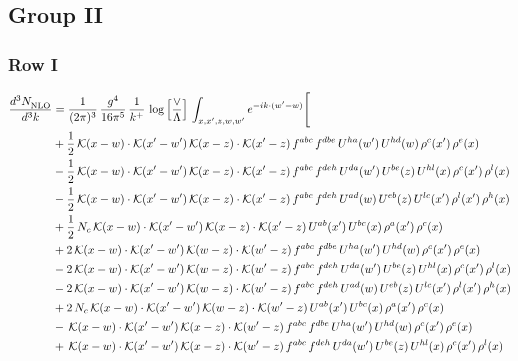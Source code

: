 \documentclass[9pt]{article}
\numberwithin{equation}{section}
\begin{document}
\subsection{Group II}
\subsubsection{Row I}
\begin{align}
 \frac{d^{3}N_{\rm NLO}^{\rm}}{d^{3}k}  & = \frac{1}{(2\pi)^{3}}\,\frac{g^{4}}{16\pi^{5}}\,\frac{1}{k^{+}}\,\log{\left[\frac{\vee}{\Lambda}\right]}\,\int_{x,x',z,w,w'}e^{-ik\cdot(w'-w)}\Bigg[\notag\\
&+\frac{1}{2}\,\mathcal{K}(x-w)\cdot\mathcal{K}(x'-w')\,\mathcal{K}(x-z)\cdot\mathcal{K}(x'-z)\,f^{abc}\,f^{dbe}\,U^{ha}(w')\,U^{hd}(w)\,\rho^{c}(x')\,\rho^{e}(x)\notag\\
&-\frac{1}{2}\,\mathcal{K}(x-w)\cdot\mathcal{K}(x'-w')\,\mathcal{K}(x-z)\cdot\mathcal{K}(x'-z)\,f^{abc}\,f^{deh}\,U^{da}(w')\,U^{be}(z)\,U^{hl}(x)\,\rho^{c}(x')\,\rho^{l}(x)\notag\\
&-\frac{1}{2}\,\mathcal{K}(x-w)\cdot\mathcal{K}(x'-w')\,\mathcal{K}(x-z)\cdot\mathcal{K}(x'-z)\,f^{abc}\,f^{deh}\,U^{ad}(w)\,U^{eb}(z)\,U^{lc}(x')\,\rho^{l}(x')\,\rho^{h}(x)\notag\\
&+\frac{1}{2}\,N_{c}\,\mathcal{K}(x-w)\cdot\mathcal{K}(x'-w')\,\mathcal{K}(x-z)\cdot\mathcal{K}(x'-z)\,U^{ab}(x')\,U^{bc}(x)\,\rho^{a}(x')\,\rho^{c}(x)\notag\\
&+2\,\mathcal{K}(x-w)\cdot\mathcal{K}(x'-w')\,\mathcal{K}(w-z)\cdot\mathcal{K}(w'-z)\,f^{abc}\,f^{dbe}\,U^{ha}(w')\,U^{hd}(w)\,\rho^{c}(x')\,\rho^{e}(x)\notag\\
&-2\,\mathcal{K}(x-w)\cdot\mathcal{K}(x'-w')\,\mathcal{K}(w-z)\cdot\mathcal{K}(w'-z)\,f^{abc}\,f^{deh}\,U^{da}(w')\,U^{be}(z)\,U^{hl}(x)\,\rho^{c}(x')\,\rho^{l}(x)\notag\\
&-2\,\mathcal{K}(x-w)\cdot\mathcal{K}(x'-w')\,\mathcal{K}(w-z)\cdot\mathcal{K}(w'-z)\,f^{abc}\,f^{deh}\,U^{ad}(w)\,U^{eb}(z)\,U^{lc}(x')\,\rho^{l}(x')\,\rho^{h}(x)\notag\\
&+2\,N_{c}\,\mathcal{K}(x-w)\cdot\mathcal{K}(x'-w')\,\mathcal{K}(w-z)\cdot\mathcal{K}(w'-z)\,U^{ab}(x')\,U^{bc}(x)\,\rho^{a}(x')\,\rho^{c}(x)\notag\\
&-\,\mathcal{K}(x-w)\cdot\mathcal{K}(x'-w')\,\mathcal{K}(x-z)\cdot\mathcal{K}(w'-z)\,f^{abc}\,f^{dbe}\,U^{ha}(w')\,U^{hd}(w)\,\rho^{c}(x')\,\rho^{e}(x)\notag\\
&+\,\mathcal{K}(x-w)\cdot\mathcal{K}(x'-w')\,\mathcal{K}(x-z)\cdot\mathcal{K}(w'-z)\,f^{abc}\,f^{deh}\,U^{da}(w')\,U^{be}(z)\,U^{hl}(x)\,\rho^{c}(x')\,\rho^{l}(x)\notag\\

\end{align}
\end{document}
